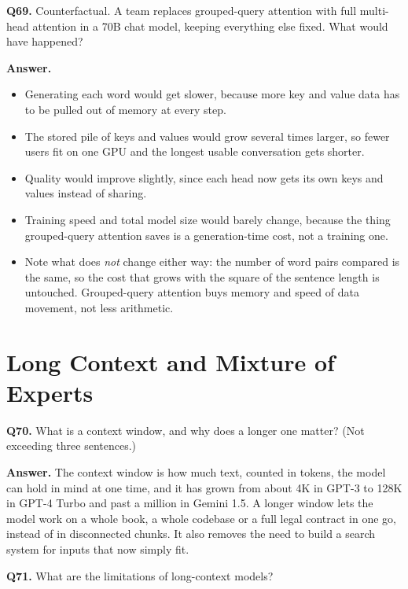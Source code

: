 \documentclass[11pt]{article}
\begin{document}
\medskip
\textbf{Q69.} Counterfactual. A team replaces grouped-query attention with full multi-head
attention in a 70B chat model, keeping everything else fixed. What would have happened?

\textbf{Answer.}
\begin{itemize}
  \item Generating each word would get slower, because more key and value data has to be pulled out of memory at every step.
  \item The stored pile of keys and values would grow several times larger, so fewer users fit on one GPU and the longest usable conversation gets shorter.
  \item Quality would improve slightly, since each head now gets its own keys and values instead of sharing.
  \item Training speed and total model size would barely change, because the thing grouped-query attention saves is a generation-time cost, not a training one.
  \item Note what does \emph{not} change either way: the number of word pairs compared is the same, so the cost that grows with the square of the sentence length is untouched. Grouped-query attention buys memory and speed of data movement, not less arithmetic.
\end{itemize}

\section{Long Context and Mixture of Experts}

\textbf{Q70.} What is a context window, and why does a longer one matter? (Not exceeding three
sentences.)

\textbf{Answer.} The context window is how much text, counted in tokens, the model can hold in
mind at one time, and it has grown from about 4K in GPT-3 to 128K in GPT-4 Turbo and past a
million in Gemini 1.5. A longer window lets the model work on a whole book, a whole codebase
or a full legal contract in one go, instead of in disconnected chunks. It also removes the
need to build a search system for inputs that now simply fit.

\medskip
\textbf{Q71.} What are the limitations of long-context models?
\end{document}
